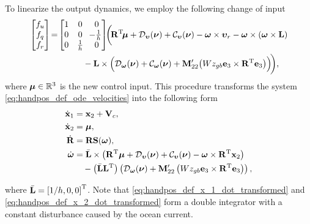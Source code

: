 To linearize the output dynamics, we employ the following change of input
\begin{align}
    \begin{bmatrix}
        f_u \\ f_q \\ f_r
    \end{bmatrix}
    \!&=\!
    \begin{bmatrix}
        1 & 0 & 0 \\ 0 & 0 & \!\!-\frac{1}{h} \\ 0 & \frac{1}{h} & 0
    \end{bmatrix}
    \!\!
    \bigg(\!\mat{R}\T\!\bs{\mu} + \mathcal{D}_{\bvel}(\vel) + \mathcal{C}_{\bvel}(\vel) - \bs{\omega} \times \bvel_r - \bs{\omega} \times \left(\bs{\omega} \times \mat{L}\right) \nonumber \\
    & \qquad \qquad - \mat{L} \times \Bigl(\mathcal{D}_{\bs{\omega}}(\vel) + \mathcal{C}_{\bs{\omega}}(\vel) + \mat{M}_{22}^{\prime}\!\left(Wz_{gb} \mat{e}_3 \times \mat{R}\T \mat{e}_3\right)\Bigr)\! \bigg),
\end{align}
where $\bm{\mu} \in \mathbb{R}^3$ is the new control input.
This procedure transforms the system \eqref{eq:handpos_def_ode_velocities} into the following form
\begin{subequations}
    \begin{align}
        \dot{\mathbf{x}}_1 &= \mathbf{x}_2 + \mathbf{V}_c, \label{eq:handpos_def_x_1_dot_transformed}\\
        \dot{\mathbf{x}}_2 &= \bm{\mu}, \label{eq:handpos_def_x_2_dot_transformed}\\
        \dot{\mathbf{R}} &= \mathbf{R}\mathbf{S}(\bm{\omega}), \label{eq:handpos_def_R_dot_CL} \\
        \dot{\bm{\omega}} &= \Bar{\mathbf{L}} \times \left(\mathbf{R}^{\mathrm{T}}\bm{\mu} + \mathcal{D}_{\bm{\upsilon}}(\bm{\nu}) + \mathcal{C}_{\bm{\upsilon}}(\bm{\nu}) - \bm{\omega} \times \mathbf{R}^{\mathrm{T}} \mathbf{x}_2\right) \label{eq:handpos_def_omega_dot_CL} \\
            & \quad - \left(\Bar{\mathbf{L}}\mathbf{L}^{\mathrm{T}}\right) \left(\mathcal{D}_{\bm{\omega}}(\bm{\nu}) + \mathbf{M}_{22}^{\prime}\left(Wz_{gb} \mathbf{e}_3 \times \mathbf{R}^{\mathrm{T}} \mathbf{e}_3\right)\right), \nonumber
    \end{align} \label{eq:handpos_def_hand_position_dynamics}
\end{subequations}

\noindent where $\Bar{\mathbf{L}} = \left[1/h, 0, 0\right]^{\mathrm{T}}$.
Note that \eqref{eq:handpos_def_x_1_dot_transformed} and \eqref{eq:handpos_def_x_2_dot_transformed} form a double integrator with a constant disturbance caused by the ocean current.

